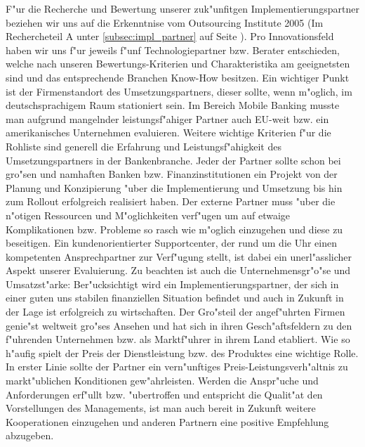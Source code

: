 F"ur die Recherche und Bewertung unserer zuk"unfitgen Implementierungspartner beziehen wir uns auf die Erkenntnise vom Outsourcing Institute 2005 (Im Rechercheteil A unter \ref{subsec:impl_partner} auf Seite \pageref{subsec:impl_partner}). Pro Innovationsfeld haben wir uns f"ur jeweils f"unf Technologiepartner bzw. Berater entschieden, welche nach unseren Bewertungs-Kriterien und Charakteristika am geeignetsten sind und das entsprechende Branchen Know-How besitzen. Ein wichtiger Punkt ist der Firmenstandort des Umsetzungspartners, dieser sollte, wenn m"oglich, im deutschsprachigem Raum stationiert sein. Im Bereich Mobile Banking musste man aufgrund mangelnder leistungsf"ahiger Partner auch EU-weit bzw. ein amerikanisches Unternehmen evaluieren. Weitere wichtige Kriterien f"ur die Rohliste sind generell die Erfahrung und Leistungsf"ahigkeit des Umsetzungspartners in der Bankenbranche. Jeder der Partner sollte schon bei gro"sen und namhaften Banken bzw. Finanzinstitutionen ein Projekt von der Planung und Konzipierung "uber die Implementierung und Umsetzung bis hin zum Rollout erfolgreich realisiert haben. Der externe Partner muss "uber die n"otigen Ressourcen und M"oglichkeiten verf"ugen um auf etwaige Komplikationen bzw. Probleme so rasch wie m"oglich einzugehen und diese zu beseitigen. Ein kundenorientierter Supportcenter, der rund um die Uhr einen kompetenten Ansprechpartner zur Verf"ugung stellt, ist dabei ein unerl"asslicher Aspekt unserer Evaluierung. Zu beachten ist auch die Unternehmensgr"o"se und Umsatzst"arke: Ber"ucksichtigt wird ein Implementierungspartner, der sich in einer guten uns stabilen finanziellen Situation befindet und auch in Zukunft in der Lage ist erfolgreich zu wirtschaften. Der Gro"steil der angef"uhrten Firmen genie"st weltweit gro"ses Ansehen und hat sich in ihren Gesch"aftsfeldern zu den f"uhrenden Unternehmen bzw. als Marktf"uhrer in ihrem Land etabliert. Wie so h"aufig spielt der Preis der Dienstleistung bzw. des Produktes eine wichtige Rolle. In erster Linie sollte der Partner ein vern"unftiges Preis-Leistungsverh"altnis zu markt"ublichen Konditionen gew"ahrleisten. Werden die Anspr"uche und Anforderungen erf"ullt bzw. "ubertroffen und entspricht die Qualit"at den Vorstellungen des Managements, ist man auch bereit in Zukunft weitere Kooperationen einzugehen und anderen Partnern eine positive Empfehlung abzugeben.